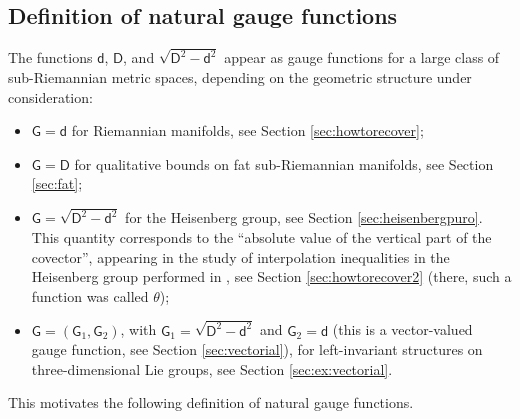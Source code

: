 \documentclass[11pt,a4paper]{article}
\theoremstyle{plain}
\theoremstyle{definition}
\theoremstyle{remark}
\numberwithin{equation}{section}
\newcommand{\sfd}{\mathsf d}
\newcommand{\sfD}{\mathsf D}
\newcommand{\sfG}{\mathsf G}
\begin{document}
\subsection{Definition of natural gauge functions}\label{sec:ngf}

The functions $\sfd$, $\sfD$, and $\sqrt{\sfD^2-\sfd^2}$ appear as gauge functions for a large class of sub-Riemannian metric spaces, depending on the geometric structure under consideration:

\begin{itemize}
\item $\sfG =\sfd$ for Riemannian manifolds, see Section \ref{sec:howtorecover};
\item $\sfG = \sfD$ for qualitative bounds on fat sub-Riemannian manifolds, see Section \ref{sec:fat};
\item $\sfG = \sqrt{\sfD^2 -\sfd^2}$ for the Heisenberg group, see Section \ref{sec:heisenbergpuro}. This quantity corresponds to the ``absolute value of the vertical part of the covector'', appearing in the study of interpolation inequalities in the Heisenberg group performed in \cite{BKS}, see Section \ref{sec:howtorecover2} (there, such a function was called $\theta$); 
\item $\sfG = (\sfG_1,\sfG_2)$, with $\sfG_1=\sqrt{\sfD^2 -\sfd^2}$ and $\sfG_2 = \sfd$ (this is a vector-valued gauge function, see Section \ref{sec:vectorial}), for left-invariant structures on three-dimensional Lie groups, see Section \ref{sec:ex:vectorial}.
\end{itemize}

This motivates the following definition of natural gauge functions.
\end{document}
